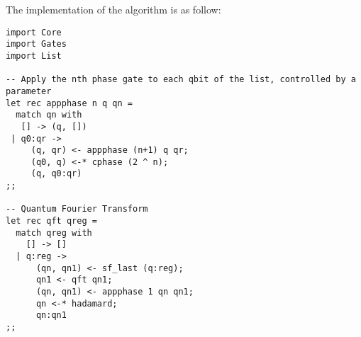 The implementation of the algorithm is as follow:

\begin{verbatim}
import Core
import Gates
import List

-- Apply the nth phase gate to each qbit of the list, controlled by a parameter
let rec appphase n q qn =
  match qn with
   [] -> (q, [])
 | q0:qr ->
     (q, qr) <- appphase (n+1) q qr;
     (q0, q) <-* cphase (2 ^ n);
     (q, q0:qr)
;;

-- Quantum Fourier Transform
let rec qft qreg =
  match qreg with
    [] -> []
  | q:reg ->
      (qn, qn1) <- sf_last (q:reg);
      qn1 <- qft qn1;
      (qn, qn1) <- appphase 1 qn qn1;
      qn <-* hadamard;
      qn:qn1
;;
\end{verbatim}



